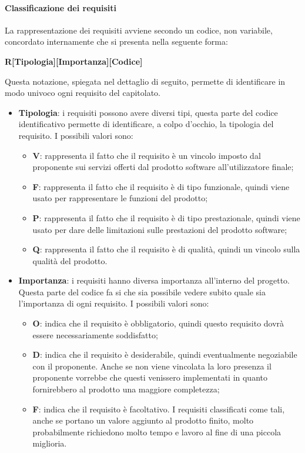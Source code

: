 \documentclass[../norme_di_progetto.tex]{subfiles}
\begin{document}
\paragraph{Classificazione dei requisiti}
La rappresentazione dei requisiti avviene secondo un codice, non variabile, concordato internamente che si presenta nella seguente forma: \par

\begin{center}
    \textbf{R[Tipologia][Importanza][Codice]}
\end{center}

Questa notazione, spiegata nel dettaglio di seguito, permette di identificare in modo univoco ogni requisito del capitolato.
\begin{itemize}
    \item \textbf{Tipologia}: i requisiti possono avere diversi tipi, questa parte del codice identificativo permette di identificare, a colpo d'occhio, la tipologia del requisito. I possibili valori sono:
    \begin{itemize}
        \item \textbf{V}: rappresenta il fatto che il requisito è un vincolo imposto dal proponente sui servizi offerti dal prodotto software all'utilizzatore finale;
        \item \textbf{F}: rappresenta il fatto che il requisito è di tipo funzionale, quindi viene usato per rappresentare le funzioni del prodotto;
        \item \textbf{P}: rappresenta il fatto che il requisito è di tipo prestazionale, quindi viene usato per dare delle limitazioni sulle prestazioni del prodotto software;
        \item \textbf{Q}: rappresenta il fatto che il requisito è di qualità, quindi un vincolo sulla qualità del prodotto.
    \end{itemize}
    
    \item \textbf{Importanza}: i requisiti hanno diversa importanza all'interno del progetto. Questa parte del codice fa si che sia possibile vedere subito quale sia l'importanza di ogni requisito. I possibili valori sono:
    \begin{itemize}
        \item \textbf{O}: indica che il requisito è obbligatorio, quindi questo requisito dovrà essere necessariamente soddisfatto;
        \item \textbf{D}: indica che il requisito è desiderabile, quindi eventualmente negoziabile con il proponente. Anche se non viene vincolata la loro presenza il proponente vorrebbe che questi venissero implementati in quanto fornirebbero al prodotto una maggiore completezza;
        \item \textbf{F}: indica che il requisito è facoltativo. I requisiti classificati come tali, anche se portano un valore aggiunto al prodotto finito, molto probabilmente richiedono molto tempo e lavoro al fine di una piccola miglioria.
    \end{itemize}
    

\end{itemize}
\end{document}
